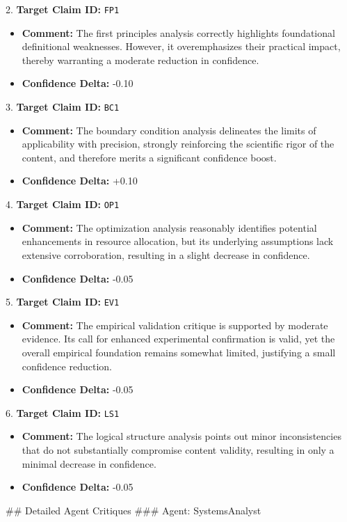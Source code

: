 \documentclass[12pt]{article}
\begin{document}
2. \textbf{Target Claim ID:} \texttt{FP1}
\begin{itemize}
  \item \textbf{Comment:} The first principles analysis correctly highlights foundational definitional weaknesses. However, it overemphasizes their practical impact, thereby warranting a moderate reduction in confidence.
  \item \textbf{Confidence Delta:} -0.10
\end{itemize}
3. \textbf{Target Claim ID:} \texttt{BC1}
\begin{itemize}
  \item \textbf{Comment:} The boundary condition analysis delineates the limits of applicability with precision, strongly reinforcing the scientific rigor of the content, and therefore merits a significant confidence boost.
  \item \textbf{Confidence Delta:} +0.10
\end{itemize}
4. \textbf{Target Claim ID:} \texttt{OP1}
\begin{itemize}
  \item \textbf{Comment:} The optimization analysis reasonably identifies potential enhancements in resource allocation, but its underlying assumptions lack extensive corroboration, resulting in a slight decrease in confidence.
  \item \textbf{Confidence Delta:} -0.05
\end{itemize}
5. \textbf{Target Claim ID:} \texttt{EV1}
\begin{itemize}
  \item \textbf{Comment:} The empirical validation critique is supported by moderate evidence. Its call for enhanced experimental confirmation is valid, yet the overall empirical foundation remains somewhat limited, justifying a small confidence reduction.
  \item \textbf{Confidence Delta:} -0.05
\end{itemize}
6. \textbf{Target Claim ID:} \texttt{LS1}
\begin{itemize}
  \item \textbf{Comment:} The logical structure analysis points out minor inconsistencies that do not substantially compromise content validity, resulting in only a minimal decrease in confidence.
  \item \textbf{Confidence Delta:} -0.05
\end{itemize}
\hrulefill
\#\# Detailed Agent Critiques
\#\#\# Agent: SystemsAnalyst
\end{document}
